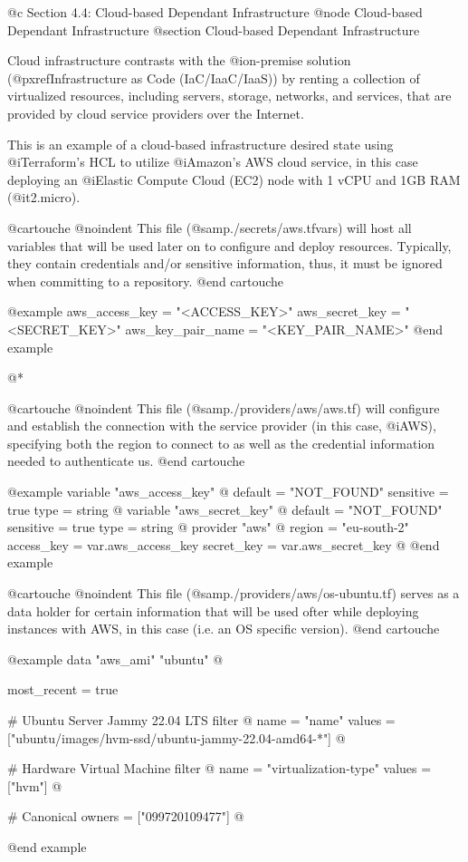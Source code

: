 @c Section 4.4: Cloud-based Dependant Infrastructure
@node Cloud-based Dependant Infrastructure
@section Cloud-based Dependant Infrastructure

Cloud infrastructure contrasts with the @i{on-premise} solution (@pxref{Infrastructure as Code (IaC/IaaC/IaaS)}) by renting a collection of virtualized resources, including servers, storage, networks, and services, that are provided by cloud service providers over the Internet.

This is an example of a cloud-based infrastructure desired state using @i{Terraform's HCL} to utilize @i{Amazon's AWS} cloud service, in this case deploying an @i{Elastic Compute Cloud (EC2)} node with 1 vCPU and 1GB RAM (@i{t2.micro}).

@cartouche
@noindent This file (@samp{./secrets/aws.tfvars}) will host all variables that will be used later on to configure and deploy resources. Typically, they contain credentials and/or sensitive information, thus, it must be ignored when committing to a repository.
@end cartouche

@example
aws_access_key = "<ACCESS_KEY>"
aws_secret_key = "<SECRET_KEY>"
aws_key_pair_name = "<KEY_PAIR_NAME>"
@end example

@*

@cartouche
@noindent This file (@samp{./providers/aws/aws.tf}) will configure and establish the connection with the service provider (in this case, @i{AWS}), specifying both the region to connect to as well as the credential information needed to authenticate us.
@end cartouche

@example
variable "aws_access_key" @{
  default = "NOT_FOUND"
  sensitive = true
  type = string
@}
variable "aws_secret_key" @{
  default = "NOT_FOUND"
  sensitive = true
  type = string
@}
provider "aws" @{
  region = "eu-south-2"
  access_key = var.aws_access_key
  secret_key = var.aws_secret_key
@}
@end example

@cartouche
@noindent This file (@samp{./providers/aws/os-ubuntu.tf}) serves as a data holder for certain information that will be used ofter while deploying instances with AWS, in this case (i.e. an OS specific version).
@end cartouche

@example
data "aws_ami" "ubuntu" @{
  most_recent = true

  # Ubuntu Server Jammy 22.04 LTS
  filter @{
    name = "name"
    values = ["ubuntu/images/hvm-ssd/ubuntu-jammy-22.04-amd64-*"]
  @}

  # Hardware Virtual Machine
  filter @{
    name = "virtualization-type"
    values = ["hvm"]
  @}

  # Canonical
  owners = ["099720109477"]
@}
@end example

